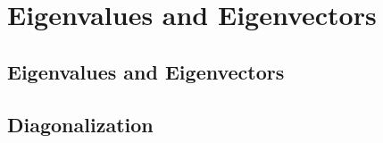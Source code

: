 \documentclass[../satmath.tex]{subfiles}
\begin{document}
\chapter{Eigenvalues and Eigenvectors}
\section{Eigenvalues and Eigenvectors}
\section{Diagonalization}
\end{document}

